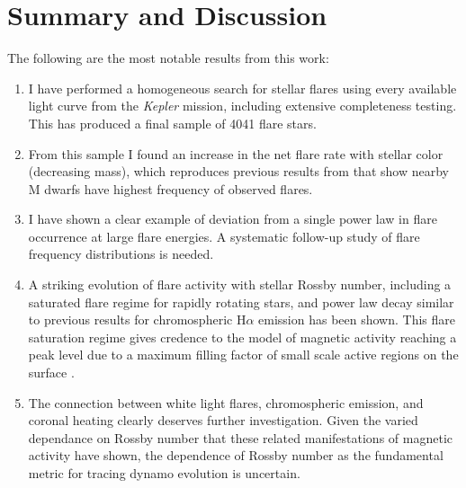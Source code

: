 \documentclass[twocolumn]{aastex6}
\newcommand{\Kepler}{\textsl{Kepler}\xspace}
\begin{document}
\section{Summary and Discussion}

The following are the most notable results from this work:
\begin{enumerate}
\item I have performed a homogeneous search for stellar flares using every available light curve from the \Kepler mission, including extensive completeness testing. This has produced a final sample of 4041 flare stars. 
\item From this sample I found an increase in the net flare rate with stellar color (decreasing mass), which reproduces previous results from \citet{walkowicz2011} that show nearby M dwarfs have highest frequency of observed flares.
\item I have shown a clear example of deviation from a single power law in flare occurrence at large flare energies. A systematic follow-up study of flare frequency distributions is needed.
\item A striking evolution of flare activity with stellar Rossby number, including a saturated flare regime for rapidly rotating stars, and power law decay similar to previous results for chromospheric H$\alpha$ emission has been shown. This flare saturation regime gives credence to the model of magnetic activity reaching a peak level due to a maximum filling factor of small scale active regions on the surface \citep{vilhu1984}.
\item The connection between white light flares, chromospheric emission, and coronal heating clearly deserves further investigation. Given the varied dependance on Rossby number that these related manifestations of magnetic activity have shown, the dependence of Rossby number as the fundamental metric for tracing dynamo evolution is uncertain.
\end{enumerate}
\end{document}
